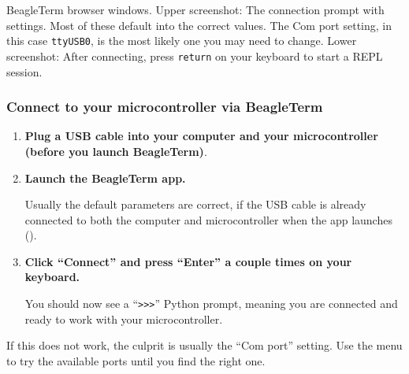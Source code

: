 \begin{marginfigure}[-18cm]
	\begin{center}
		\caption[Connection via BeagleTerm.]{BeagleTerm browser windows. Upper screenshot: The connection prompt with settings. Most of these default into the correct values. The Com port setting, in this case \texttt{ttyUSB0}, is the most likely one you may need to change. Lower screenshot: After connecting, press \texttt{return} on your keyboard to start a REPL session.}
	\end{center}
\end{marginfigure}

\subsubsection{\howto{} Connect to your microcontroller via BeagleTerm}
\begin{enumerate}
	\item \textbf{Plug a USB cable into your computer and your microcontroller (before you launch BeagleTerm)}. 
	\item \textbf{Launch the BeagleTerm app.} 
	
	Usually the default parameters are correct, if the USB cable is already connected to both the computer and microcontroller when the app launches ().
	\item \textbf{Click ``Connect'' and press ``Enter'' a couple times on your keyboard.} 
	
	You should now see a ``\verb|>>>|'' Python prompt, meaning you are connected and ready to work with your microcontroller.
\end{enumerate}
If this does not work, the culprit is usually the ``Com port'' setting.
Use the menu to try the available ports until you find the right one.


